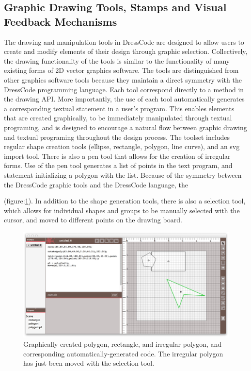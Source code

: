 \documentclass{sigchi}
\begin{document}
\subsection{Graphic Drawing Tools, Stamps and Visual Feedback Mechanisms}
The drawing and manipulation tools in DressCode are designed to allow users to create and modify elements of their design through graphic selection. Collectively, the drawing functionality of the tools is similar to the functionality of many existing forms of  2D vector graphics software. The tools are distinguished from other graphics software tools because they maintain a direct symmetry with the DressCode programming language. Each tool correspond directly to a method in the drawing API. More importantly, the use of each tool automatically generates a corresponding textual statement in a user's program. This enables elements that are created graphically, to be immediately manipulated through textual programing, and is designed to encourage a natural flow between graphic drawing and textual programing throughout the design process. The toolset includes regular shape creation tools (ellipse, rectangle, polygon, line curve), and an svg import tool. There is also a pen tool that allows for the creation of irregular forms. Use of the pen tool generates a list of points in the text program, and statement initializing a polygon with the list. Because of the symmetry between the DressCode graphic tools and the DressCode language, the 

(figure:\ref{fig:auto_generated_code}). In addition to the shape generation tools, there is also a selection tool, which allows for individual shapes and groups to be manually selected with the cursor, and moved to different points on the drawing board.

\begin{center}
\begin{figure}[h!]
\includegraphics[width=\columnwidth]{images/auto_generated_code.jpg}
\caption{Graphically created polygon, rectangle, and irregular polygon, and corresponding automatically-generated code. The irregular polygon has just been moved with the selection tool.}
\label{fig:auto_generated_code}
\end{figure}
\end{center}
\end{document}
